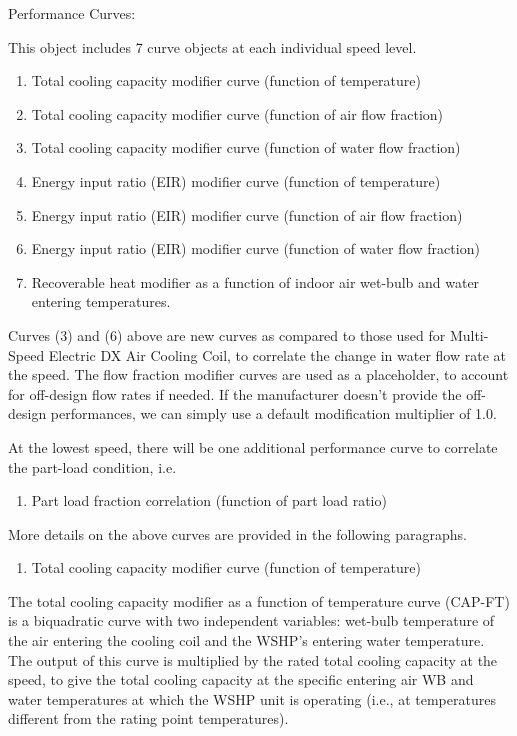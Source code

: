 Performance Curves:

This object includes 7 curve objects at each individual speed level.

\begin{enumerate}
\def\labelenumi{\arabic{enumi})}
\item
  Total cooling capacity modifier curve (function of temperature)
\item
  Total cooling capacity modifier curve (function of air flow fraction)
\item
  Total cooling capacity modifier curve (function of water flow fraction)
\item
  Energy input ratio (EIR) modifier curve (function of temperature)
\item
  Energy input ratio (EIR) modifier curve (function of air flow fraction)
\item
  Energy input ratio (EIR) modifier curve (function of water flow fraction)
\item
  Recoverable heat modifier as a function of indoor air wet-bulb and water entering temperatures.
\end{enumerate}

Curves (3) and (6) above are new curves as compared to those used for Multi-Speed Electric DX Air Cooling Coil, to correlate the change in water flow rate at the speed. The flow fraction modifier curves are used as a placeholder, to account for off-design flow rates if needed. If the manufacturer doesn't provide the off-design performances, we can simply use a default modification multiplier of 1.0.

At the lowest speed, there will be one additional performance curve to correlate the part-load condition, i.e.

\begin{enumerate}
\def\labelenumi{\arabic{enumi})}
\setcounter{enumi}{7}
\item Part load fraction correlation (function of part load ratio)
\end{enumerate}

More details on the above curves are provided in the following paragraphs.

\begin{enumerate}
\def\labelenumi{\arabic{enumi})}
\item Total cooling capacity modifier curve (function of temperature)
\end{enumerate}

The total cooling capacity modifier as a function of temperature curve (CAP-FT) is a biquadratic curve with two independent variables: wet-bulb temperature of the air entering the cooling coil and the WSHP's entering water temperature. The output of this curve is multiplied by the rated total cooling capacity at the speed, to give the total cooling capacity at the specific entering air WB and water temperatures at which the WSHP unit is operating (i.e., at temperatures different from the rating point temperatures).

